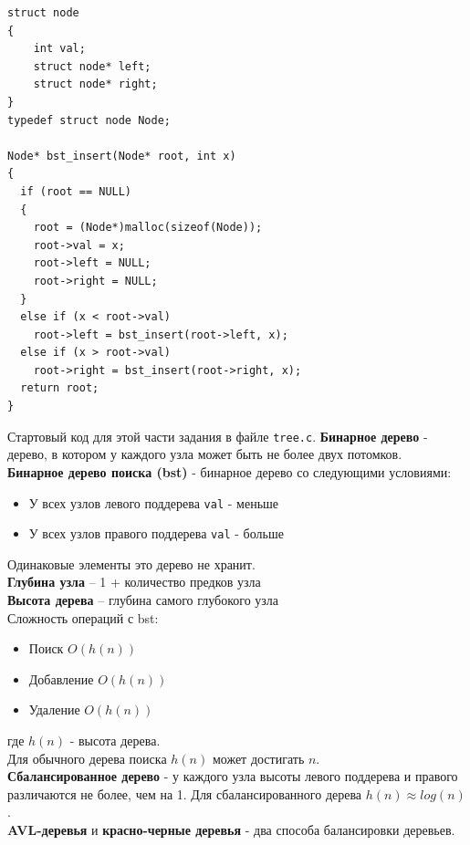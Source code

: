 \documentclass{article}
\begin{document}
\begin{multicols}{2}
\begin{lstlisting}
struct node
{
    int val;
    struct node* left;
    struct node* right;
}
typedef struct node Node;

Node* bst_insert(Node* root, int x)
{
  if (root == NULL)
  {
    root = (Node*)malloc(sizeof(Node));
    root->val = x;
    root->left = NULL;
    root->right = NULL;
  }
  else if (x < root->val)
    root->left = bst_insert(root->left, x);
  else if (x > root->val)
    root->right = bst_insert(root->right, x);
  return root;
}
\end{lstlisting}
\vfill\null
\columnbreak
Стартовый код для этой части задания в файле \texttt{tree.c}.
\textbf{Бинарное дерево} - дерево, в котором у каждого узла может быть не более двух потомков.\\
\textbf{Бинарное дерево поиска (bst)} - бинарное дерево со следующими условиями:
\begin{itemize}
\item У всех узлов левого поддерева \texttt{val} - меньше
\item У всех узлов правого поддерева \texttt{val} - больше
\end{itemize}
Одинаковые элементы это дерево не хранит.\\
\textbf{Глубина узла} – 1 + количество предков узла\\
\textbf{Высота дерева} – глубина самого глубокого узла\\
Сложность операций с bst:
\begin{itemize}
\item Поиск $O(h(n))$
\item Добавление $O(h(n))$
\item Удаление $O(h(n))$
\end{itemize}
где $h(n)$ - высота дерева.\\
Для обычного дерева поиска $h(n)$ может достигать $n$.\\
\textbf{Сбалансированное дерево} - у каждого узла высоты левого поддерева и правого различаются не более, чем на 1.
Для сбалансированного дерева $h(n) \approx log(n)$.\\
\textbf{AVL-деревья} и \textbf{красно-черные деревья} - два способа балансировки деревьев.
\vfill\null
\end{multicols}
\newpage
\end{document}
